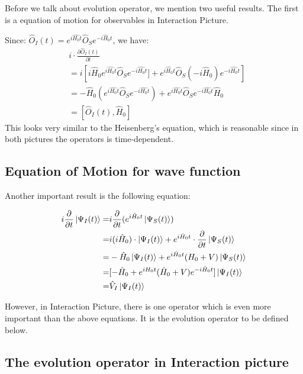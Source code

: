 \documentclass{article}
\numberwithin{equation}{subsection} %
\begin{document}
	Before we talk about evolution operator, we mention two useful results. The first is a equation of motion for observables in Interaction Picture.
	
	Since: $\hat{O}_I(t) = e^{i\hat{H_0}t}\hat{O}_S e^{-i\hat{H}_0t}$, we have:
	\begin{align}
		& i\cdot \frac{\partial \hat{O}_I(t)}{\partial t}\nonumber\\
		&= i\left[  i\hat{H}_0 e^{i\hat{H_0}t} \hat{O}_S e^{-i\hat{H_0}t}] + e^{i\hat{H_0}t} \hat{O}_S(-i\hat{H}_0) e^{-i\hat{H_0}t} \right]\nonumber\\
		&= -\hat{H}_0 (e^{i\hat{H_0}t} \hat{O}_S e^{-i\hat{H_0}t})
			+ e^{i\hat{H_0}t}\hat{O}_Se^{-i\hat{H_0}t} \hat{H}_0 \nonumber\\
		&= [\hat{O}_I(t),\hat{H}_0]
	\end{align}
	This looks very similar to the Heisenberg's equation, which is reasonable since in both pictures the operators is time-dependent.
	
	\subsection{Equation of Motion for wave function}
	
	Another important result is the following equation:
		
	\begin{align}
	i \frac{\partial}{\partial t} \ket{\Psi_I(t)} 
	=& i \frac{\partial}{\partial t} (e^{i\hat{H}_0t} \ket{\Psi_S(t)})
	\\
	=& i (i\hat{H}_0)\cdot \ket{\Psi_I(t)} + e^{i\hat{H}_0t} \cdot \frac{\partial}{\partial t} \ket{\Psi_S(t)}
	\\
	=& -\hat{H}_0 \ket{\Psi_I(t)} + e^{i\hat{H}_0t} (H_0+V) \ket{\Psi_S(t)}
	\\
	=& [-\hat{H}_0 + e^{iH_0t} (\hat{H}_0 +V) e^{-i\hat{H}_0t}] \ket{\Psi_I(t)}
	\\
	\label{eq:motion} =& \hat{V}_I \ket{\Psi_I(t)}		
	\end{align}
	
	
	However, in Interaction Picture, there is one operator which is even more important than the above equations. It is the evolution operator to be defined below.
	
	\subsection{The evolution operator in Interaction picture}
	
\end{document}
